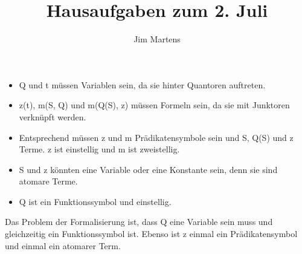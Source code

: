 \documentclass[10pt,a4paper,oneside,ngerman,numbers=noenddot]{scrartcl}
\begin{document}
\author{Jim Martens}
\title{Hausaufgaben zum 2. Juli}
\maketitle

\section{} %
\subsection{} %
\begin{itemize}
	\item Q und t müssen Variablen sein, da sie hinter Quantoren auftreten.
	\item z(t), m(S, Q) und m(Q(S), z) müssen Formeln sein, da sie mit Junktoren verknüpft werden.
	\item Entsprechend müssen z und m Prädikatensymbole sein und S, Q(S) und z Terme. z ist einstellig und m ist zweistellig.
	\item S und z könnten eine Variable oder eine Konstante sein, denn sie sind atomare Terme.
	\item Q ist ein Funktionssymbol und einstellig.
\end{itemize}
Das Problem der Formalisierung ist, dass Q eine Variable sein muss und gleichzeitig ein Funktionssymbol ist. Ebenso ist z einmal ein Prädikatensymbol und einmal ein atomarer Term.
\subsection{} %
\subsection{} %
\end{document}
